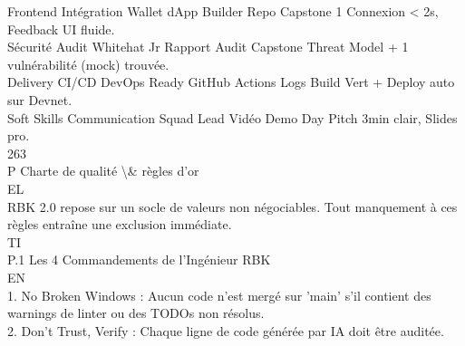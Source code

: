 \vspace{0.5em}
Frontend       Intégration Wallet              dApp Builder     Repo Capstone 1        Connexion \textless{} 2s, Feedback UI fluide.\\
\vspace{0.5em}
Sécurité       Audit                           Whitehat Jr      Rapport Audit Capstone Threat Model + 1 vulnérabilité (mock) trouvée.\\
\vspace{0.5em}
Delivery       CI/CD                           DevOps Ready     GitHub Actions Logs    Build Vert + Deploy auto sur Devnet.\\
\vspace{0.5em}
Soft Skills    Communication                   Squad Lead       Vidéo Demo Day         Pitch 3min clair, Slides pro.\\
\vspace{0.5em}
\vspace{0.5em}
\vspace{0.5em}
\vspace{0.5em}
263\\
P \textbar{} Charte de qualité \textbackslash{}& règles d’or\\
\vspace{0.5em}
\vspace{0.5em}
\vspace{0.5em}
\vspace{0.5em}
EL\\
RBK 2.0 repose sur un socle de valeurs non négociables. Tout manquement à ces règles entraîne une exclusion immédiate.\\
\vspace{0.5em}
\vspace{0.5em}
\vspace{0.5em}
\vspace{0.5em}
TI\\
P.1 Les 4 Commandements de l’Ingénieur RBK\\
\vspace{0.5em}
\vspace{0.5em}
\vspace{0.5em}
\vspace{0.5em}
EN\\
1. No Broken Windows : Aucun code n’est mergé sur ’main’ s’il contient des warnings de linter ou des TODOs non résolus.\\
\vspace{0.5em}
2. Don’t Trust, Verify : Chaque ligne de code générée par IA doit être auditée.\\
